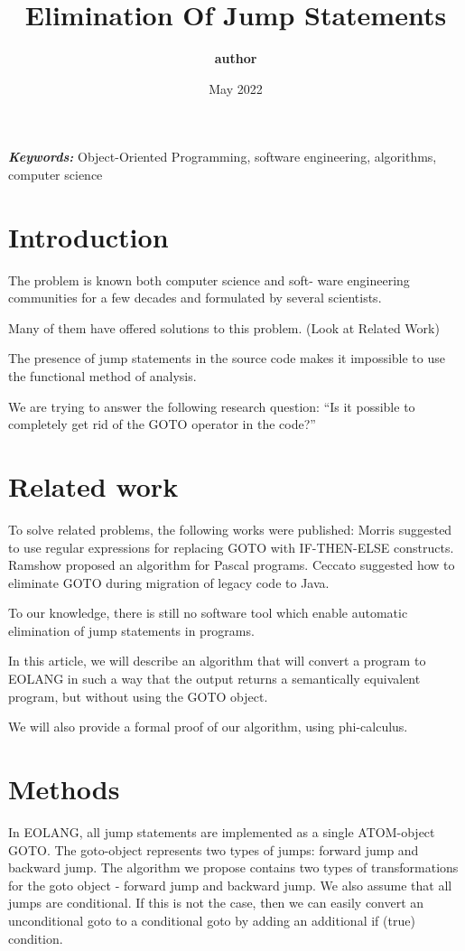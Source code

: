 \documentclass[two column]{article}
\title{\textbf{Elimination Of Jump Statements}}
\author{\textbf{author}}
\date{May 2022}
\providecommand{\keywords}[1]
{
  \small
  \textbf{\textit{Keywords:}} #1
}
\begin{document}
\maketitle


\keywords{Object-Oriented Programming, software engineering, algorithms, computer science}

\section{Introduction}
The problem is known both computer science and soft-
ware engineering communities for a few decades and formulated by several scientists.

Many of them have offered solutions to this problem. (Look at Related Work)

The presence of jump statements in the source code makes it impossible to use the functional method of analysis.

We are trying to answer the following research question: “Is it possible to completely get rid of the GOTO operator in the code?”


\section{Related work}
To solve related problems, the following works were published:
Morris suggested to use regular expressions for replacing GOTO with IF-THEN-ELSE constructs.
Ramshow proposed an algorithm for Pascal programs.
Ceccato suggested how to eliminate GOTO during migration of legacy code to Java.

To our knowledge, there is still no software tool  which enable automatic elimination of jump statements in programs.

In this article, we will describe an algorithm that will convert a program to EOLANG in such a way that the output returns a semantically equivalent program, but without using the GOTO object.

We will also provide a formal proof of our algorithm, using phi-calculus.

\section{Methods}
In EOLANG, all jump statements are implemented as a
single ATOM-object GOTO. The goto-object represents two types of jumps: forward jump and backward jump.
The algorithm we propose contains two types of transformations for the goto object - forward jump and backward jump.
We also assume that all jumps are conditional. If this is not the case, then we can easily convert an unconditional goto to a conditional goto by adding an additional if (true) condition.
\end{document}
